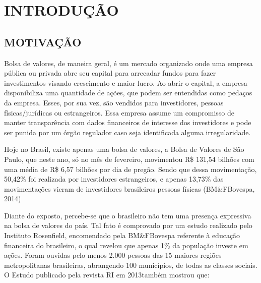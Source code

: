 \chapter[Introdução]{INTRODUÇÃO}

\section{MOTIVAÇÃO}

Bolsa de valores, de maneira geral, é um mercado organizado onde uma empresa pública ou privada abre seu capital para arrecadar fundos para fazer investimentos visando crescimento e maior lucro. Ao abrir o capital, a empresa disponibiliza uma quantidade de ações, que podem ser entendidas como pedaços da empresa. Esses, por sua vez, são vendidos para investidores, pessoas físicas/jurídicas ou estrangeiros. Essa empresa assume um compromisso de manter transparência com dados financeiros de interesse dos investidores e pode ser punida por um órgão regulador caso seja identificada alguma irregularidade.

Hoje no Brasil, existe apenas uma bolsa de valores, a Bolsa de Valores de São Paulo, que neste ano, só no mês de fevereiro, movimentou R\$ 131,54 bilhões com uma média de R\$ 6,57 bilhões por dia de pregão. Sendo que dessa movimentação, 50,42\% foi realizada por investidores estrangeiros, e apenas 13,73\% das movimentações vieram de investidores brasileiros pessoas físicas (BM\&FBovespa, 2014)

Diante do exposto, percebe-se que o brasileiro não tem uma presença expressiva na bolsa de valores do país. Tal fato é comprovado por um estudo realizado pelo Instituto Rosenfield, encomendado pela BM\&FBovespa referente à educação financeira do brasileiro, o qual revelou que apenas 1\% da população investe em ações. Foram ouvidas pelo menos 2.000 pessoas das 15 maiores regiões metropolitanas brasileiras, abrangendo 100 municípios, de todas as classes sociais\cite{isabella2013}. O Estudo  publicado pela revista RI em 2013também mostrou que:

